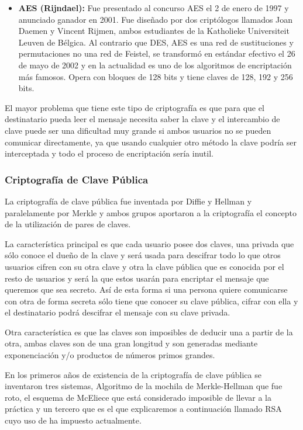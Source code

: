 \begin{itemize}
\item \textbf{AES (Rijndael):} Fue presentado al concurso AES el 2 de enero de 1997 y anunciado ganador en 2001. Fue diseñado por dos criptólogos llamados Joan Daemen y Vincent Rijmen, ambos estudiantes de la Katholieke Universiteit Leuven de Bélgica. Al contrario que DES, AES es una red de sustituciones y permutaciones no una red de Feistel, se transformó en estándar efectivo el 26 de mayo de 2002 y en la actualidad es uno de los algoritmos de encriptación más famosos. Opera con bloques de 128 bits y tiene claves de 128, 192 y 256 bits.

\end{itemize}

El mayor problema que tiene este tipo de criptografía es que para que el destinatario pueda leer el mensaje necesita saber la clave y el intercambio de clave puede ser una dificultad muy grande si ambos usuarios no se pueden comunicar directamente, ya que usando cualquier otro método la clave podría ser interceptada y todo el proceso de encriptación sería inutil.

\subsubsection*{Criptografía de Clave Pública}

La criptografía de clave pública fue inventada por Diffie y Hellman y paralelamente por Merkle y ambos grupos aportaron a la criptografía el concepto de la utilización de pares de claves.

La característica principal es que cada usuario posee dos claves, una privada que sólo conoce el dueño de la clave y será usada para descifrar todo lo que otros usuarios cifren con su otra clave y otra la clave pública que es conocida por el resto de usuarios y será la que estos usarán para encriptar el mensaje que queremos que sea secreto. Así de esta forma si una persona quiere comunicarse con otra de forma secreta sólo tiene que conocer su clave pública, cifrar con ella y el destinatario podrá descifrar el mensaje con su clave privada. 

Otra característica es que las claves son imposibles de deducir una a partir de la otra, ambas claves son de una gran longitud y son generadas mediante exponenciación y/o productos de números primos grandes.

En los primeros años de existencia de la criptografía de clave pública se inventaron tres sistemas, Algoritmo de la mochila de Merkle-Hellman que fue roto, el esquema de McEliece que está considerado imposible de llevar a la práctica y un tercero que es el que explicaremos a continuación llamado RSA cuyo uso de ha impuesto actualmente.

